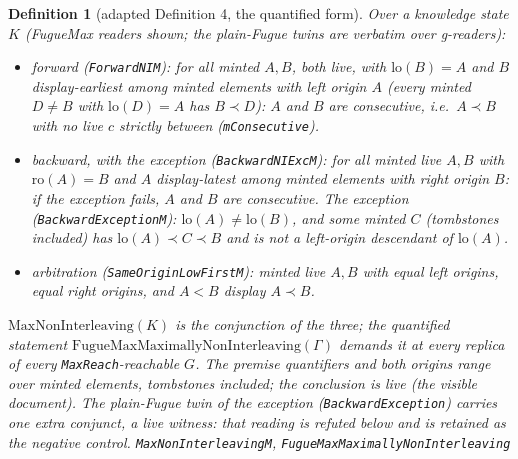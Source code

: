 \documentclass[11pt]{article}
\newtheorem{definition}[theorem]{Definition}
\newcommand{\lean}[1]{\texttt{#1}}
\begin{document}
\begin{definition}[adapted Definition 4, the quantified form]
\label{def:wkdef4}
Over a knowledge state $K$ (FugueMax readers shown; the plain-Fugue
twins are verbatim over g-readers):
\begin{itemize}[leftmargin=2em]
\item[(1)] \emph{forward} (\lean{ForwardNIM}): for all minted $A,
  B$, both live, with $\mathrm{lo}(B) = A$ and $B$ display-earliest
  among minted elements with left origin $A$ (every minted $D \ne B$
  with $\mathrm{lo}(D) = A$ has $B \prec D$): $A$ and $B$ are
  \emph{consecutive}, i.e.\ $A \prec B$ with no \emph{live} $c$
  strictly between (\lean{mConsecutive}).
\item[(2)] \emph{backward, with the exception}
  (\lean{BackwardNIExcM}): for all minted live $A, B$ with
  $\mathrm{ro}(A) = B$ and $A$ display-latest among minted elements
  with right origin $B$: if the exception fails, $A$ and $B$ are
  consecutive. The exception (\lean{BackwardExceptionM}):
  $\mathrm{lo}(A) \ne \mathrm{lo}(B)$, and some \emph{minted} $C$
  (tombstones included) has $\mathrm{lo}(A) \prec C \prec B$ and is
  not a left-origin descendant of $\mathrm{lo}(A)$.
\item[(3)] \emph{arbitration} (\lean{SameOriginLowFirstM}): minted
  live $A, B$ with equal left origins, equal right origins, and
  $A < B$ display $A \prec B$.
\end{itemize}
$\mathrm{MaxNonInterleaving}(K)$ is the conjunction of the three;
the quantified statement
$\mathrm{FugueMaxMaximallyNonInterleaving}(\Gamma)$ demands it at
every replica of every \lean{MaxReach}-reachable $G$. The premise
quantifiers and both origins range over minted elements, tombstones
included; the conclusion is live (the visible document). The
plain-Fugue twin of the exception (\lean{BackwardException})
carries one extra conjunct, a \emph{live} witness: that reading is
refuted below and is retained as the negative control.
\hfill\lean{MaxNonInterleavingM},
\lean{FugueMaxMaximallyNonInterleaving}
\end{definition}
\end{document}
